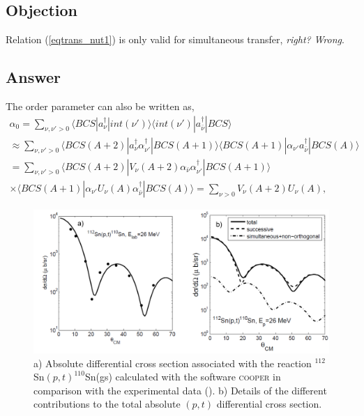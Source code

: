 \subsection*{Objection}
Relation (\ref{eqtrans_nut1}) is only valid for simultaneous transfer, \textit{right?} \textit{Wrong}.
\subsection*{Answer}
The order parameter can also be written as,
\begin{multline}
\alpha_0=\sum_{\nu,\nu'>0}\langle BCS |a^\dagger_{\nu}|int(\nu')\rangle\langle int(\nu')|a^\dagger_{\bar\nu}|BCS\rangle\\
\approx\sum_{\nu,\nu'>0}\langle BCS (A+2) |a^\dagger_{\nu}\alpha^\dagger_{\nu'}|BCS (A+1)\rangle\langle BCS (A+1)|\alpha_{\nu'}a^\dagger_{\bar\nu}|BCS (A)\rangle \\
=\sum_{\nu,\nu'>0}\langle BCS(A+2) |V_\nu(A+2)\alpha_{\bar\nu}\alpha^\dagger_{\nu'}|BCS(A+1)\rangle\\
\times\langle BCS(A+1)|\alpha_{\nu'}U_\nu(A)\alpha^\dagger_{\bar\nu}|BCS(A)\rangle
=\sum_{\nu>0}V_\nu(A+2)U_{\nu}(A),
\end{multline}
\begin{figure}
\centerline{\includegraphics*[width=\textwidth,angle=0]{nutshell/figs/fig2A2.pdf}}
\caption{a) Absolute differential cross section associated with the reaction $^{112}$Sn$(p,t)^{110}$Sn(gs) calculated with the software \textsc{cooper} in comparison with the experimental data (\cite{Guazzoni:06}). b) Details of the different contributions to the total absolute $(p,t)$ differential cross section.}\label{fig_2A2}
\end{figure}
